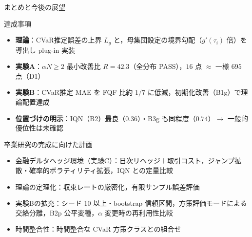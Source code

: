 \documentclass[aspectratio=169, 10pt]{beamer}
\newcommand{\blue}[1]{\textcolor{blue!80!black}{#1}}
\newcommand{\Lg}{L_g}
\begin{document}
\begin{frame}{まとめと今後の展望}
  \begin{exampleblock}{達成事項}
    \begin{itemize}
      \item \textbf{理論}：CVaR推定誤差の上界 $\Lg$ と，母集団設定の境界勾配（$g'(\tau_i)$ 倍）を導出し plug-in 実装
      \item \textbf{実験A}：$\alpha N\ge 2$ 最小改善比 \alert{$R=42.3$}（全分布 PASS），$16$ 点 $\approx$ 一様 $695$ 点（D1）
      \item \textbf{実験B}：CVaR推定 MAE を FQF 比\alert{約 $1/7$} に低減，初期化改善（B1g）で理論配置達成
      \item \textbf{位置づけの明示}：IQN（B2）最良（$0.36$）・B3g も同程度（$0.74$）$\to$ 一般的優位性は未確認
    \end{itemize}
  \end{exampleblock}
  \begin{block}{卒業研究の完成に向けた計画}
    \begin{itemize}
      \item \blue{金融デルタヘッジ環境（実験C）}：日次リヘッジ＋取引コスト，ジャンプ拡散・確率的ボラティリティ拡張，IQN との定量比較
      \item \blue{理論の定理化}：収束レートの厳密化，有限サンプル誤差評価
      \item \blue{実験Bの拡充}：シード $10$ 以上・bootstrap 信頼区間，\blue{方策評価モード}による交絡分離，B2p 公平変種，$\alpha$ 変更時の再利用性比較
      \item \blue{時間整合性}：時間整合な CVaR 方策クラスとの組合せ
    \end{itemize}
  \end{block}
\end{frame}
\end{document}
